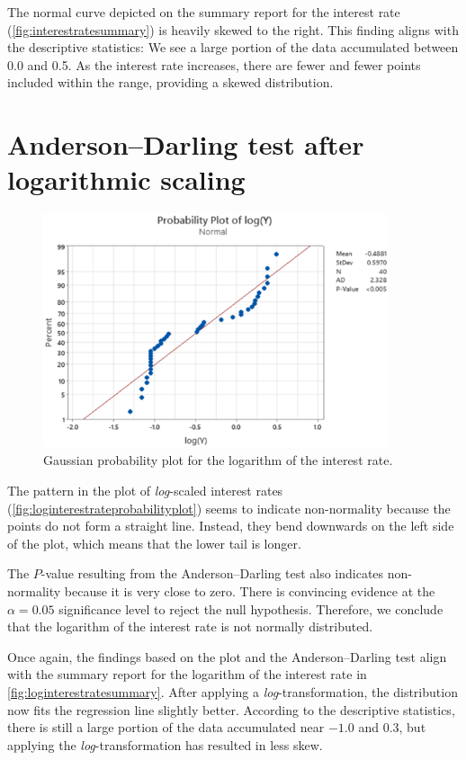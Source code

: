 \documentclass[12pt]{article}
\begin{document}
The normal curve depicted on the summary report for the interest rate (\autoref{fig:interestratesummary}) is heavily skewed to the right. This finding aligns with the descriptive statistics: We see a large portion of the data accumulated between 0.0 and 0.5. As the interest rate increases, there are fewer and fewer points included within the range, providing a skewed distribution.
\section{Anderson--Darling test after logarithmic scaling}
\begin{figure}[h]
\begin{center}
\includegraphics[width=4in]{images/log-interest-rate-probability-plot.png}
\end{center}
\caption{Gaussian probability plot for the logarithm of the interest rate. \label{fig:loginterestrateprobabilityplot}}
\end{figure}
The pattern in the plot of \textit{log}-scaled interest rates (\autoref{fig:loginterestrateprobabilityplot}) seems to indicate non-normality because the points do not form a straight line. Instead, they bend downwards on the left side of the plot, which means that the lower tail is longer.

The $P$-value resulting from the Anderson--Darling test also indicates non-normality because it is very close to zero. There is convincing evidence at the $\alpha=0.05$ significance level to reject the null hypothesis. Therefore, we conclude that the logarithm of the interest rate is not normally distributed.

Once again, the findings based on the plot and the Anderson--Darling test align with the summary report for the logarithm of the interest rate in \autoref{fig:loginterestratesummary}. After applying a \textit{log}-transformation, the distribution now fits the regression line slightly better. According to the descriptive statistics, there is still a large portion of the data accumulated near $-1.0$ and 0.3, but applying the \textit{log}-transformation has resulted in less skew.
\end{document}
